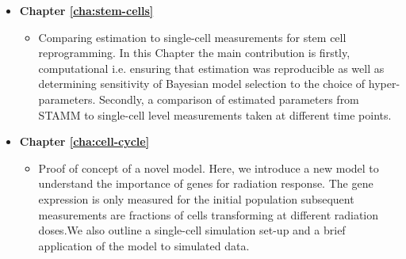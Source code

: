 \begin{itemize}
\begin{itemize}
\end{itemize}
\item {\bf Chapter \ref{cha:stem-cells}}
  \begin{itemize}
  \item Comparing estimation to single-cell measurements for stem cell reprogramming. In this Chapter the main contribution is firstly, computational i.e. ensuring that estimation was reproducible as well as determining sensitivity of Bayesian model selection to the choice of hyper-parameters. Secondly, a comparison of estimated parameters from STAMM to single-cell level measurements taken at different time points.
  \end{itemize}

\item {\bf Chapter \ref{cha:cell-cycle}}
  \begin{itemize}
  \item Proof of concept of a novel model. Here, we introduce a new model to understand the importance of genes for radiation response. The gene expression is only measured for the initial population subsequent measurements are fractions of cells transforming at different radiation doses.We also outline a single-cell simulation set-up and a brief application of the model to simulated data.
  \end{itemize}
\end{itemize}



